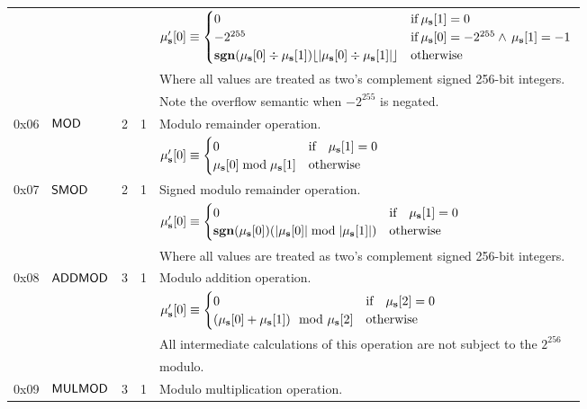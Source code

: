 \begin{tabu}{r l r r l}
&&&& $\mathbf{\mu}'_{\mathbf{s}}[0] \equiv \begin{cases}0 & \text{if} \> \mathbf{\mu}_{\mathbf{s}}[1] = 0\\ -2^{255} & \text{if} \> \mathbf{\mu}_{\mathbf{s}}[0] = -2^{255} \wedge \, \mathbf{\mu}_{\mathbf{s}}[1] = -1\\ \mathbf{sgn} (\mathbf{\mu}_{\mathbf{s}}[0] \div \mathbf{\mu}_{\mathbf{s}}[1]) \lfloor |\mathbf{\mu}_{\mathbf{s}}[0] \div \mathbf{\mu}_{\mathbf{s}}[1]| \rfloor & \text{otherwise}\end{cases}$  \\
&&&& Where all values are treated as two's complement signed 256-bit integers. \\
&&&& Note the overflow semantic when $-2^{255}$ is negated.\\
\midrule
0x06 & $\mathsf{MOD}$ & 2 & 1 & Modulo remainder operation. \\
&&&& $\mathbf{\mu}'_{\mathbf{s}}[0] \equiv \begin{cases}0 & \text{if} \quad \mathbf{\mu}_{\mathbf{s}}[1] = 0\\ \mathbf{\mu}_{\mathbf{s}}[0] \bmod \mathbf{\mu}_{\mathbf{s}}[1] & \text{otherwise}\end{cases}$  \\
\midrule
0x07 & $\mathsf{SMOD}$ & 2 & 1 & Signed modulo remainder operation. \\
&&&& $\mathbf{\mu}'_{\mathbf{s}}[0] \equiv \begin{cases}0 & \text{if} \quad \mathbf{\mu}_{\mathbf{s}}[1] = 0\\ \mathbf{sgn} (\mathbf{\mu}_{\mathbf{s}}[0]) (|\mathbf{\mu}_{\mathbf{s}}[0]| \bmod |\mathbf{\mu}_{\mathbf{s}}[1]|) & \text{otherwise}\end{cases}$  \\
&&&& Where all values are treated as two's complement signed 256-bit integers. \\
\midrule
0x08 & $\mathsf{ADDMOD}$ & 3 & 1 & Modulo addition operation. \\
&&&& $\mathbf{\mu}'_{\mathbf{s}}[0] \equiv \begin{cases}0 & \text{if} \quad \mathbf{\mu}_{\mathbf{s}}[2] = 0\\ (\mathbf{\mu}_{\mathbf{s}}[0] + \mathbf{\mu}_{\mathbf{s}}[1]) \mod {\mathbf{\mu}}_{\mathbf{s}}[2] & \text{otherwise}\end{cases}$  \\
&&&& All intermediate calculations of this operation are not subject to the $2^{256}$ \\
&&&& modulo. \\
\midrule
0x09 & $\mathsf{MULMOD}$ & 3 & 1 & Modulo multiplication operation. \\

\end{tabu}
